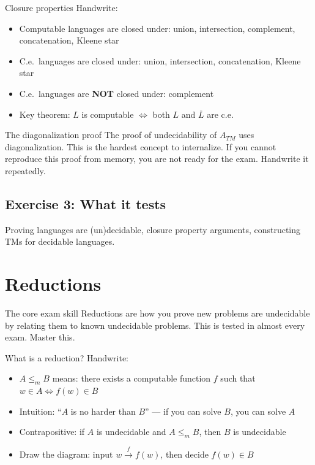 \documentclass[11pt,a4paper]{article}
\begin{document}
\begin{writebox}{Closure properties}
Handwrite:
\begin{itemize}[nosep]
\item Computable languages are closed under: union, intersection, complement, concatenation, Kleene star
\item C.e.\ languages are closed under: union, intersection, concatenation, Kleene star
\item C.e.\ languages are \textbf{NOT} closed under: complement
\item Key theorem: $L$ is computable $\iff$ both $L$ and $\overline{L}$ are c.e.
\end{itemize}
\end{writebox}

\begin{dangerbox}{The diagonalization proof}
The proof of undecidability of $A_{TM}$ uses diagonalization. This is the hardest concept to internalize. If you cannot reproduce this proof from memory, you are not ready for the exam. Handwrite it repeatedly.
\end{dangerbox}

\subsection*{Exercise 3: What it tests}
Proving languages are (un)decidable, closure property arguments, constructing TMs for decidable languages.

\section{Reductions}

\begin{whybox}{The core exam skill}
Reductions are how you prove new problems are undecidable by relating them to known undecidable problems. This is tested in almost every exam. Master this.
\end{whybox}

\begin{writebox}{What is a reduction?}
Handwrite:
\begin{itemize}[nosep]
\item $A \leq_m B$ means: there exists a computable function $f$ such that $w \in A \iff f(w) \in B$
\item Intuition: ``$A$ is no harder than $B$'' --- if you can solve $B$, you can solve $A$
\item Contrapositive: if $A$ is undecidable and $A \leq_m B$, then $B$ is undecidable
\item Draw the diagram: input $w \xrightarrow{f} f(w)$, then decide $f(w) \in B$
\end{itemize}
\end{writebox}
\end{document}
